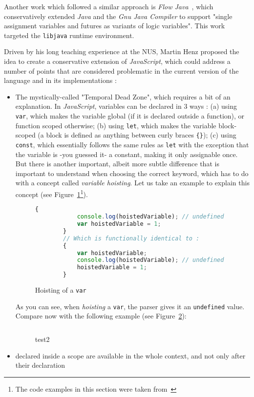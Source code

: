 Another work which followed a similar approach is \textit{Flow Java}~\cite{drejhammar2003flow}, which conservatively extended \textit{Java} and the \textit{Gnu Java Compiler} to support "single assignment variables and futures as variants of logic variables".
This work targeted the \texttt{libjava} runtime environment.\newline

Driven by his long teaching experience at the NUS, Martin Henz proposed the idea to create a conservative extension of \textit{JavaScript}, which could address a number of points that are considered problematic in the current version of the language and in its implementations :
\begin{itemize}
    \item The mystically-called "Temporal Dead Zone", which requires a bit of an explanation.
    In \textit{JavaScript}, variables can be declared in 3 ways : (a) using \texttt{var}, which makes the variable global (if it is declared outside a function), or function scoped otherwise; (b) using \texttt{let}, which makes the variable block-scoped (a block is defined as anything between curly braces \texttt{\{\}}); (c) using \texttt{const}, which essentially follows the same rules as \texttt{let} with the exception that the variable is -you guessed it- a constant, making it only assignable once.
    But there is another important, albeit more subtle difference that is important to understand when choosing the correct keyword, which has to do with a concept called \textit{variable hoisting}.\newline
    Let us take an example to explain this concept (see Figure~\ref{fig:js-hoisting}\footnote{The code examples in this section were taken from~\cite{jsTDZ}}).
    \begin{figure}[H]
    \begin{lstlisting}[language=JavaScript]
        {
            console.log(hoistedVariable); // undefined
            var hoistedVariable = 1;
        }
        // Which is functionally identical to :
        {
            var hoistedVariable;
            console.log(hoistedVariable); // undefined
            hoistedVariable = 1;
        }
    \end{lstlisting}
    \caption{Hoisting of a \texttt{var}}
    \label{fig:js-hoisting}
    \end{figure}
    As you can see, when \textit{hoisting} a \texttt{var}, the parser gives it an \texttt{undefined} value.
    Compare now with the following example (see Figure~\ref{fig:js-hoisting-2}):
    \begin{figure}[H]
    \begin{lstlisting}[language=javaScript]
    \end{lstlisting}
    \caption{test2}
    \label{fig:js-hoisting-2}
    \end{figure}
    \item declared inside a scope are available in the whole context, and not only after their declaration
\end{itemize}


